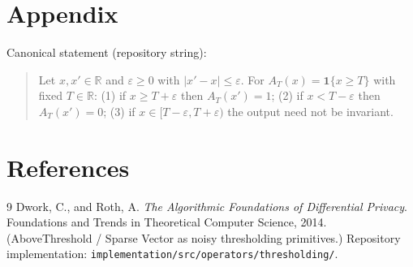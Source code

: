 \documentclass[11pt]{article}
\begin{document}
\section{Appendix}
Canonical statement (repository string):
\begin{quote}\small
Let \(x,x'\in\mathbb{R}\) and \(\varepsilon\ge 0\) with \(\lvert x'-x\rvert\le\varepsilon\).
For \(A_T(x)=\mathbf{1}\{x\ge T\}\) with fixed \(T\in\mathbb{R}\):
(1) if \(x\ge T+\varepsilon\) then \(A_T(x')=1\);
(2) if \(x<T-\varepsilon\) then \(A_T(x')=0\);
(3) if \(x\in[T-\varepsilon,T+\varepsilon)\) the output need not be invariant.
\end{quote}

\section*{References}
\begin{thebibliography}{9}
Dwork, C., and Roth, A.
\emph{The Algorithmic Foundations of Differential Privacy}.
Foundations and Trends in Theoretical Computer Science, 2014.
(AboveThreshold / Sparse Vector as noisy thresholding primitives.)
Repository implementation:
\texttt{implementation/src/operators/thresholding/}.
\end{thebibliography}
\end{document}
